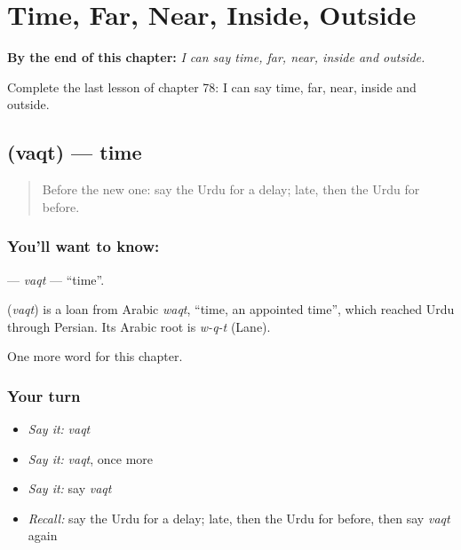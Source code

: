 
\chapter{Time, Far, Near, Inside, Outside}
\label{ch:ur-time-far-near-inside-outside}

\begin{chapteropening}
\textbf{By the end of this chapter:} \emph{I can say time, far, near, inside and outside.}

Complete the last lesson of chapter 78: I can say time, far, near, inside and outside.
\end{chapteropening}

\section[\texorpdfstring{\ur{وقت} (vaqt)}{وقت (vaqt)}]{ (vaqt) — time}

\label{lesson:UR-C78-vaqt}



\begin{quote}
Before the new one: say the Urdu for a delay; late, then the Urdu for before.
\end{quote}

\subsection*{You'll want to know: }
\textbf{} — \emph{vaqt} — \textquotedblleft{}time\textquotedblright{}.

\begin{cousinweb}
\textbf{} (\emph{vaqt}) is a loan from Arabic \emph{waqt}, \textquotedblleft{}time, an appointed time\textquotedblright{}, which reached Urdu through Persian. Its Arabic root is \emph{w-q-t} (Lane).
\end{cousinweb}

\begin{grammarlens}[title={What you've built}]
One more word for this chapter.
\end{grammarlens}

\subsection*{Your turn}
\begin{itemize}
\raggedright
  \item \emph{Say it:} \emph{vaqt}
  \item \emph{Say it:} \emph{vaqt}, once more
  \item \emph{Say it:} say \emph{vaqt}
  \item \emph{Recall:} say the Urdu for a delay; late, then the Urdu for before, then say \emph{vaqt} again
\end{itemize}

